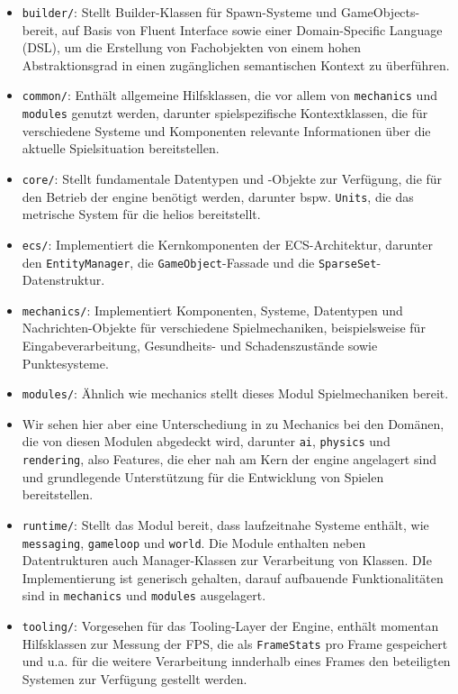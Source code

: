 \begin{itemize}
    \itemsep0.5em
    \item \texttt{builder/}: Stellt Builder-Klassen für Spawn-Systeme und GameObjects-bereit, auf Basis von Fluent Interface sowie einer Domain-Specific Language (DSL), um die Erstellung von Fachobjekten von einem hohen Abstraktionsgrad in einen zugänglichen semantischen Kontext zu überführen.
    \item \texttt{common/}: Enthält allgemeine Hilfsklassen, die vor allem von \texttt{mechanics} und \texttt{modules} genutzt werden, darunter spielspezifische Kontextklassen, die für verschiedene Systeme und Komponenten relevante Informationen über die aktuelle Spielsituation bereitstellen.
    \item \texttt{core/}: Stellt fundamentale Datentypen und -Objekte zur Verfügung, die für den Betrieb der engine benötigt werden, darunter bspw. \texttt{Units}, die das metrische System für die helios bereitstellt.
    \item \texttt{ecs/}: Implementiert die Kernkomponenten der ECS-Architektur, darunter den \texttt{EntityManager}, die \texttt{GameObject}-Fassade und die \texttt{SparseSet}-Datenstruktur.
    \item \texttt{mechanics/}: Implementiert Komponenten, Systeme, Datentypen und Nachrichten-Objekte für verschiedene Spielmechaniken, beispielsweise für Eingabeverarbeitung, Gesundheits- und Schadenszustände sowie Punktesysteme.
    \item \texttt{modules/}: Ähnlich wie mechanics stellt dieses Modul Spielmechaniken bereit.
    \item Wir sehen hier aber eine Unterschediung in zu Mechanics bei den Domänen, die von diesen Modulen abgedeckt wird, darunter \texttt{ai}, \texttt{physics} und \texttt{rendering}, also Features, die eher nah am Kern der engine angelagert sind und grundlegende Unterstützung für die Entwicklung von Spielen bereitstellen.
    \item \texttt{runtime/}: Stellt das Modul bereit, dass laufzeitnahe Systeme enthält, wie \texttt{messaging}, \texttt{gameloop} und \texttt{world}.
    Die Module enthalten neben Datentrukturen auch Manager-Klassen zur Verarbeitung von Klassen.
    DIe Implementierung ist generisch gehalten, darauf aufbauende Funktionalitäten sind in \texttt{mechanics} und \texttt{modules} ausgelagert.
    \item \texttt{tooling/}: Vorgesehen für das Tooling-Layer der Engine, enthält momentan Hilfsklassen zur Messung der FPS, die als \texttt{FrameStats} pro Frame gespeichert und u.a. für die weitere Verarbeitung innderhalb eines Frames den beteiligten Systemen zur Verfügung gestellt werden.
\end{itemize}

